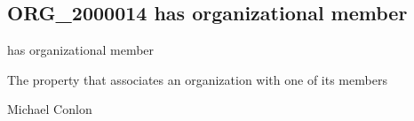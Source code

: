 \documentclass[letterpaper,10pt,english]{sphinxmanual}
\begin{document}
\subsection{ORG\_2000014 \sphinxhyphen{} has organizational member}
\label{\detokenize{doc-ORG_2000014:org-2000014-has-organizational-member}}\label{\detokenize{doc-ORG_2000014:index-0}}\label{\detokenize{doc-ORG_2000014::doc}}
\begin{sphinxShadowBox}

\sphinxAtStartPar
has organizational member
\end{sphinxShadowBox}

\begin{sphinxShadowBox}

\sphinxAtStartPar
{}
\end{sphinxShadowBox}

\begin{sphinxShadowBox}

\sphinxAtStartPar
The property that associates an organization with one of its members
\end{sphinxShadowBox}

\begin{sphinxShadowBox}

\sphinxAtStartPar
Michael Conlon 
\end{sphinxShadowBox}

\begin{sphinxShadowBox}

\sphinxAtStartPar
{\hyperref[\detokenize{doc-ORG_0000001::doc}]{}}
\end{sphinxShadowBox}

\begin{sphinxShadowBox}

\sphinxAtStartPar
{\hyperref[\detokenize{doc-ORG_0000001::doc}]{}}
\end{sphinxShadowBox}

\begin{sphinxShadowBox}

\sphinxAtStartPar
{\hyperref[\detokenize{doc-ORG_2000015::doc}]{}}
\end{sphinxShadowBox}
\end{document}
